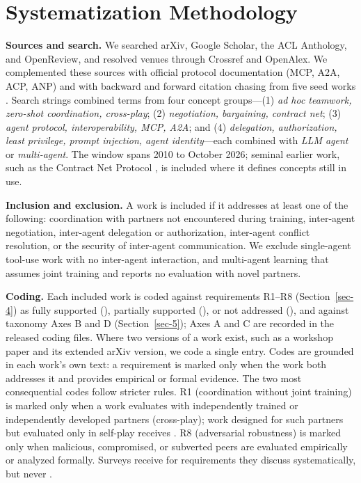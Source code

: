 \documentclass[conference]{IEEEtran}
\newcommand{\full}{{\small\CIRCLE}}
\newcommand{\half}{{\small\LEFTcircle}}
\newcommand{\none}{{\small\Circle}}
\begin{document}
\section{Systematization Methodology}\label{sec-2}

\textbf{Sources and search.} We searched arXiv, Google Scholar, the ACL Anthology, and OpenReview, and resolved venues through Crossref and OpenAlex. We complemented these sources with official protocol documentation (MCP, A2A, ACP, ANP) and with backward and forward citation chasing from five seed works \cite{stone2010adhoc, hu2020otherplay, qian2026mpac, veski2026capmas, hammond2025multiagent}. Search strings combined terms from four concept groups---(1) \emph{ad hoc teamwork, zero-shot coordination, cross-play}; (2) \emph{negotiation, bargaining, contract net}; (3) \emph{agent protocol, interoperability, MCP, A2A}; and (4) \emph{delegation, authorization, least privilege, prompt injection, agent identity}---each combined with \emph{LLM agent} or \emph{multi-agent}. The window spans 2010 to October 2026; seminal earlier work, such as the Contract Net Protocol \cite{smith1980contractnet}, is included where it defines concepts still in use.

\textbf{Inclusion and exclusion.} A work is included if it addresses at least one of the following: coordination with partners not encountered during training, inter-agent negotiation, inter-agent delegation or authorization, inter-agent conflict resolution, or the security of inter-agent communication. We exclude single-agent tool-use work with no inter-agent interaction, and multi-agent learning that assumes joint training and reports no evaluation with novel partners.

\textbf{Coding.} Each included work is coded against requirements R1--R8 (Section~\ref{sec-4}) as fully supported (\full{}), partially supported (\half{}), or not addressed (\none{}), and against taxonomy Axes B and D (Section~\ref{sec-5}); Axes A and C are recorded in the released coding files. Where two versions of a work exist, such as a workshop paper and its extended arXiv version, we code a single entry. Codes are grounded in each work's own text: a requirement is marked \full{} only when the work both addresses it and provides empirical or formal evidence. The two most consequential codes follow stricter rules. R1 (coordination without joint training) is marked \full{} only when a work evaluates with independently trained or independently developed partners (cross-play); work designed for such partners but evaluated only in self-play receives \half{}. R8 (adversarial robustness) is marked \full{} only when malicious, compromised, or subverted peers are evaluated empirically or analyzed formally. Surveys receive \half{} for requirements they discuss systematically, but never \full{}.
\end{document}
